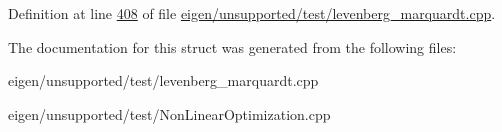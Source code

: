 Definition at line \hyperlink{eigen_2unsupported_2test_2levenberg__marquardt_8cpp_source_l00408}{408} of file \hyperlink{eigen_2unsupported_2test_2levenberg__marquardt_8cpp_source}{eigen/unsupported/test/levenberg\+\_\+marquardt.\+cpp}.



The documentation for this struct was generated from the following files\+:\begin{DoxyCompactItemize}
\item 
eigen/unsupported/test/levenberg\+\_\+marquardt.\+cpp\item 
eigen/unsupported/test/\+Non\+Linear\+Optimization.\+cpp\end{DoxyCompactItemize}
